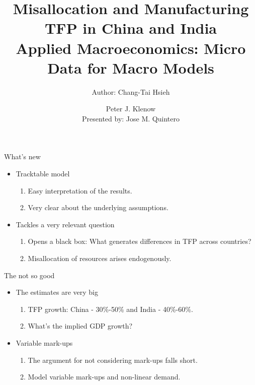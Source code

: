 \documentclass[usenames,dvipsnames,aspectratio=169]{beamer}
\title{Misallocation and Manufacturing TFP in China and India  \\ \small{Applied Macroeconomics: Micro Data for Macro Models} }
\author{Author: Chang-Tai Hsieh \and Peter J. Klenow \\ Presented by: Jose M. Quintero}
\begin{document}
\begin{frame}
  \titlepage
\end{frame}

\begin{frame}{What's new}
\begin{itemize}
    \item Tracktable model 
    \begin{enumerate}
        \item Easy interpretation of the results.
        \item Very clear about the underlying assumptions. 
    \end{enumerate}
    \vfill
    \item Tackles a very relevant question 
    \begin{enumerate}
        \item Opens a black box: What generates differences in TFP across countries?
        \item Misallocation of resources arises endogenously. 
    \end{enumerate}
\end{itemize}
\end{frame}

\begin{frame}{The not so good}
     \begin{itemize}
         \item The estimates are very big
         \begin{enumerate}
             \item TFP growth: China - 30\%-50\% and India - 40\%-60\%. 
             \item What's the implied GDP growth?
         \end{enumerate}
         \vfill
         \item Variable mark-ups
         \begin{enumerate}
             \item The argument for not considering mark-ups falls short. 
             \item Model variable mark-ups and non-linear demand. 
         \end{enumerate}
     \end{itemize}
\end{frame}
\end{document}
